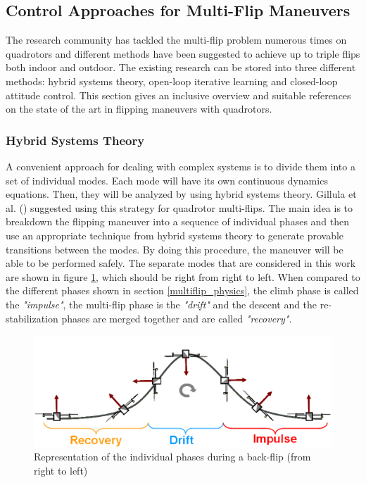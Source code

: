 \documentclass{thesisreport}
\begin{document}
 \subsection{Control Approaches for Multi-Flip Maneuvers}
 
The research community has tackled the multi-flip problem numerous times on quadrotors and different methods have been suggested to achieve up to triple flips both indoor and outdoor. The existing research can be stored into three different methods: hybrid systems theory, open-loop iterative learning and closed-loop attitude control. This section gives an inclusive overview and suitable references on the state of the art in flipping maneuvers with quadrotors.
  
 \subsubsection{Hybrid Systems Theory}
 
A convenient approach for dealing with complex systems is to divide them into a set of individual modes. Each mode will have its own continuous dynamics equations. Then, they will be analyzed by using hybrid systems theory. Gillula et al. (\cite{Gillula2011,Gillula2010}) suggested using this strategy for quadrotor multi-flips. The main idea is to breakdown the flipping maneuver into a sequence of individual phases and then use an appropriate technique from hybrid systems theory to generate provable transitions between the modes. By doing this procedure, the maneuver will be able to be performed safely. The separate modes that are considered in this work are shown in figure \ref{hybrid_systems_theory_figure}, which should be right from right to left. When compared to the different phases shown in section \ref{multiflip_physics}, the climb phase is called the \textit{"impulse"}, the multi-flip phase is the \textit{"drift"} and the descent and the re-stabilization phases are merged together and are called \textit{"recovery"}.
 
 \begin{figure}[h]
 \centering
 \includegraphics[width=\textwidth]{Images/Flip/Hybrid_Systems_Theory}
 \caption{Representation of the individual phases during a back-flip (from right to left)\cite{Gillula2011}}
 \label{hybrid_systems_theory_figure}
 \end{figure}
\end{document}
